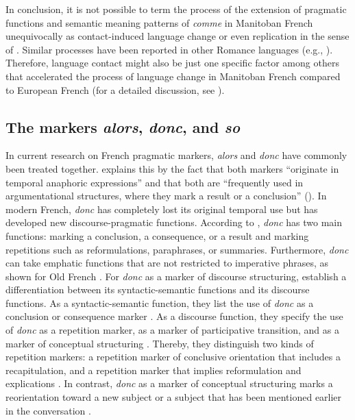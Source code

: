\documentclass[output=paper]{langscibook}
\begin{document}
In conclusion, it is not possible to term the process of the extension of pragmatic functions and semantic meaning patterns of \textit{comme} in Manitoban French unequivocally as contact-induced language change or even replication in the sense of \citet{Heine.2005,Heine.2010}. Similar processes have been reported in other Romance languages (e.g., \citealt{Mihatsch.2009a}). Therefore, language contact might also be just one specific factor among others that accelerated the process of language change in Manitoban French compared to European French (for a detailed discussion, see \citealt{Hennecke.2014}).

\subsection{The markers \textit{alors}, \textit{donc}, and \textit{so}}
\label{hennecke:sec:3.2}
In current research on French pragmatic markers, \textit{alors} and \textit{donc} have commonly been treated together. \citeauthor{MosegaardHansen.1998} explains this by the fact that both markers “originate in temporal anaphoric expressions” and that both are “frequently used in argumentational structures, where they mark a result or a conclusion” (\citeyear[321]{MosegaardHansen.1998}). In modern French, \textit{donc} has completely lost its original temporal use but has developed new discourse-pragmatic functions. According to \citet[165]{MosegaardHansen.1997}, \textit{donc} has two main functions: marking a conclusion, a consequence, or a result and marking repetitions such as reformulations, paraphrases, or summaries. Furthermore, \textit{donc} can take emphatic functions that are not restricted to imperative phrases, as shown for Old French \citep[329]{MosegaardHansen.1998}. For \textit{donc} as a marker of discourse structuring, \citet{Bolly.2009} establish a differentiation between its syntactic-semantic functions and its discourse functions. As a syntactic-semantic function, they list the use of \textit{donc} as a conclusion or consequence marker \citep[7]{Bolly.2009}. As a discourse function, they specify the use of \textit{donc} as a repetition marker, as a marker of participative transition, and as a marker of conceptual structuring \citep[12]{Bolly.2009}. Thereby, they distinguish two kinds of repetition markers: a repetition marker of conclusive orientation that includes a recapitulation, and a repetition marker that implies reformulation and explications \citep[12]{Bolly.2009}. In contrast, \textit{donc} as a marker of conceptual structuring marks a reorientation toward a new subject or a subject that has been mentioned earlier in the conversation \citep[9]{Bolly.2009}. 
\end{document}
